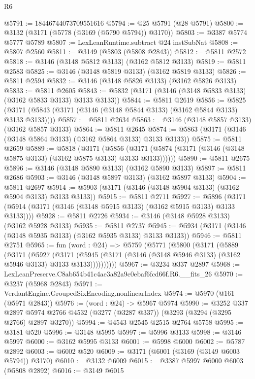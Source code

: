 \begin{lexlean}{R6}
\begin{coremodule}
@5791 := 18446744073709551616
@5794 := @25 @5791 (@28 @5791)
@5800 := @3132 (@3171 (@5778 (@3169 (@5790 @5794)) @3170))
@5803 := @3387 @5774 @5777 @5789
@5807 := LexLeanRuntime.subtract @24 instSubNat
@5808 := @5807 @2560
@5811 := @3149 (@5803 (@5808 @2843))
@5812 := @5811 @2572
@5818 := @3146 (@3148 @5812 @3133) (@3162 @5812 @3133)
@5819 := @5811 @2583
@5825 := @3146 (@3148 @5819 @3133) (@3162 @5819 @3133)
@5826 := @5811 @2594
@5832 := @3146 (@3148 @5826 @3133) (@3162 @5826 @3133)
@5833 := @5811 @2605
@5843 := @5832 (@3171 (@3146 (@3148 @5833 @3133) (@3162 @5833 @3133) @3133 @3133))
@5844 := @5811 @2619
@5856 := @5825 (@3171 (@5843 (@3171 (@3146 (@3148 @5844 @3133) (@3162 @5844 @3133) @3133 @3133))))
@5857 := @5811 @2634
@5863 := @3146 (@3148 @5857 @3133) (@3162 @5857 @3133)
@5864 := @5811 @2645
@5874 := @5863 (@3171 (@3146 (@3148 @5864 @3133) (@3162 @5864 @3133) @3133 @3133))
@5875 := @5811 @2659
@5889 := @5818
    (@3171
      (@5856 (@3171 (@5874 (@3171 (@3146 (@3148 @5875 @3133) (@3162 @5875 @3133) @3133 @3133))))))
@5890 := @5811 @2675
@5896 := @3146 (@3148 @5890 @3133) (@3162 @5890 @3133)
@5897 := @5811 @2686
@5903 := @3146 (@3148 @5897 @3133) (@3162 @5897 @3133)
@5904 := @5811 @2697
@5914 := @5903 (@3171 (@3146 (@3148 @5904 @3133) (@3162 @5904 @3133) @3133 @3133))
@5915 := @5811 @2711
@5927 := @5896 (@3171 (@5914 (@3171 (@3146 (@3148 @5915 @3133) (@3162 @5915 @3133) @3133 @3133))))
@5928 := @5811 @2726
@5934 := @3146 (@3148 @5928 @3133) (@3162 @5928 @3133)
@5935 := @5811 @2737
@5945 := @5934 (@3171 (@3146 (@3148 @5935 @3133) (@3162 @5935 @3133) @3133 @3133))
@5946 := @5811 @2751
@5965 := fun (word : @24) =>
  @5759
    (@5771
      (@5800
        (@3171
          (@5889
            (@3171
              (@5927
                (@3171
                  (@5945 (@3171 (@3146 (@3148 @5946 @3133) (@3162 @5946 @3133) @3133 @3133))))))))))
@5967 := @3234 @337 @2897
@5968 := LexLeanPreserve.C8ab654b41c4ae3a82a9c0ebaf6fcd66f.R6.__fits_26
@5970 := @3237 (@5968 @2843)
@5971 := VerdantEngine.GroupedSixEncoding.nonlinearIndex
@5974 := @5970 (@161 (@5971 @2843))
@5976 := (word : @24) -> @5967 @5974
@5990 := @3252
    @337
    @2897
    @5974
    @2766
    @4532
    (@3277 (@3287 @337))
    (@3293 (@3294 (@3295 @2766) @2897 @3270))
@5994 := @4543 @2545 @2515 @2764 @5758
@5995 := @3181 @520
@5996 := @3148 @5995
@5997 := @5996 @3133
@5998 := @3146 @5997
@6000 := @3162 @5995 @3133
@6001 := @5998 @6000
@6002 := @5787 @2892
@6003 := @6002 @520
@6009 := @3171 (@6001 (@3169 (@3149 @6003 @5794)) @3170)
@6010 := @3132 @6009
@6015 := @3387 @5997 @6000 @6003 (@5808 @2892)
@6016 := @3149 @6015

\end{coremodule}
\end{lexlean}

